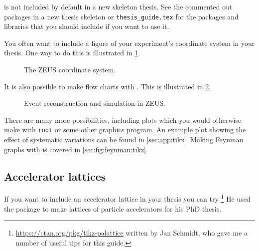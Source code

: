 \TikZ is not included by default in a new skeleton thesis. See the
commented out packages in a new thesis skeleton or
\texttt{thesis\_guide.tex} for the packages and \TikZ libraries that
you should include if you want to use it.

You often want to include a figure of your experiment's coordinate
system in your thesis. One way to do this is illustrated in
\cref{fig:tikz:coord}.

\begin{figure}[htbp]
  \centering
   {%
  }{%
    
  }
  \caption{The ZEUS coordinate system.}%
  \label{fig:tikz:coord}
\end{figure}

It is also possible to make flow charts with \TikZ. This is
illustrated in \cref{fig:tikz:flow}.

\begin{figure}[htbp]
  \centering
   {%
  }{%
    
  }
  \caption[Event reconstruction and simulation in ZEUS]{Event reconstruction and simulation in ZEUS.}%
  \label{fig:tikz:flow}
\end{figure}

There are many more possibilities,
including plots which you would otherwise make with \texttt{root} or
some other graphics program. An example plot showing the effect of
systematic variations can be found in \cref{sec:app:tikz}. Making
Feynman graphs with \TikZ is covered in \cref{sec:fig:feynman:tikz}.


\subsection{Accelerator lattices}%
\label{sec:fig:accelerator}

If you want to include an accelerator lattice in your thesis you can try
\footnote{%
  \url{https://ctan.org/pkg/tikz-palattice}
  written by Jan Schmidt, who gave me a number of useful tips for this guide.}
He used the package to make lattices of particle accelerators for his PhD thesis.


